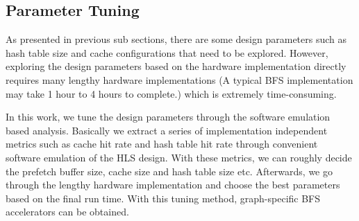 \subsection{Parameter Tuning}
As presented in previous sub sections, there are some design 
parameters such as hash table size and cache configurations
that need to be explored. However, exploring the design parameters 
based on the hardware implementation directly requires many lengthy 
hardware implementations (A typical BFS implementation may 
take 1 hour to 4 hours to complete.) which is extremely time-consuming.

In this work, we tune the design parameters through the software 
emulation based analysis. Basically we extract a series of 
implementation independent metrics such as cache hit rate and hash table hit rate 
through convenient software emulation of the HLS design. 
With these metrics, we can roughly decide the prefetch buffer size, 
cache size and hash table size etc. 
Afterwards, we go through the lengthy 
hardware implementation and choose the best parameters based on the final 
run time. With this tuning method, graph-specific BFS accelerators 
can be obtained. 

%
%
%

